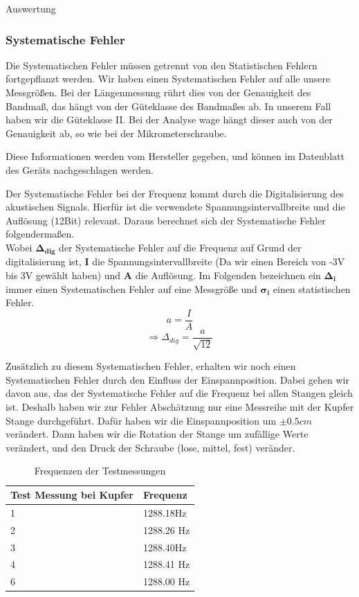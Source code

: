 \documentclass[twoside]{protokoll}
\begin{document}
\begin{aufgabe}{Auswertung}
\subsubsection{Systematische Fehler}
Die Systematischen Fehler müssen getrennt von den Statistischen Fehlern fortgepflanzt werden.
Wir haben einen Systematischen Fehler auf alle unsere Messgrößen.
Bei der Längenmessung rührt dies von der Genauigkeit des Bandmaß, das hängt von der Güteklasse des Bandmaßes ab.
In unserem Fall haben wir die Güteklasse II.
Bei der Analyse wage  hängt dieser auch von der Genauigkeit ab, so wie bei der Mikrometerschraube. 
 
Diese Informationen werden vom Hersteller gegeben, und können im Datenblatt des Geräts nachgeschlagen werden. 

Der Systematische Fehler bei der Frequenz kommt durch die Digitalisierung des akustischen Signals. Hierfür ist die verwendete Spannungsintervallbreite und die Auflösung (12Bit) relevant. Daraus berechnet sich der Systematische Fehler folgendermaßen.\\
 Wobei $ \pmb{\Delta_{dig}} $ der Systematische Fehler auf die Frequenz auf Grund der digitalisierung ist, \textbf{I} die Spannungsintervallbreite (Da wir einen Bereich von -3V bis 3V gewählt haben) und \textbf{A} die Auflösung. Im Folgenden bezeichnen ein $\pmb{\Delta_i}$ immer einen Systematischen Fehler auf eine Messgröße und $ \pmb{\sigma_i}$ einen statistischen Fehler.\\ 
\begin{equation}
         a = \frac{I}{A}
    \end{equation}
\begin{equation}
         \Rightarrow 
         \Delta_{dig} = \frac{a}{\sqrt{12}}
\end{equation}

Zusätzlich zu diesem Systematischen Fehler, erhalten wir noch einen Systematischen Fehler durch den Einfluss der Einspannposition.
Dabei gehen wir davon aus, das der Systematische Fehler auf die Frequenz bei allen Stangen gleich ist.
Deshalb haben wir zur Fehler Abschätzung nur eine Messreihe mit der Kupfer Stange durchgeführt.
Dafür haben wir die Einspannposition um $\pm{0.5}{cm}$ verändert.
Dann haben wir die Rotation der Stange um zufällige Werte verändert, und den Druck der Schraube (lose, mittel, fest) veränder.
 

\begin{table}[H]
    \centering
    \begin{tabularx}{0.7\textwidth}{X l} %
        \toprule
        \textbf{Test Messung bei Kupfer} & \textbf{Frequenz} \\
        \midrule
            1 & 1288.18Hz \\
            2 & 1288.26 Hz \\
            3 & 1288.40Hz \\
            4 & 1288.41 Hz \\
            6 & 1288.00 Hz \\
        \bottomrule
    \end{tabularx}
    \caption{Frequenzen der Testmessungen}
    \label{tab:mytable}
\end{table}


\end{aufgabe}
\end{document}

